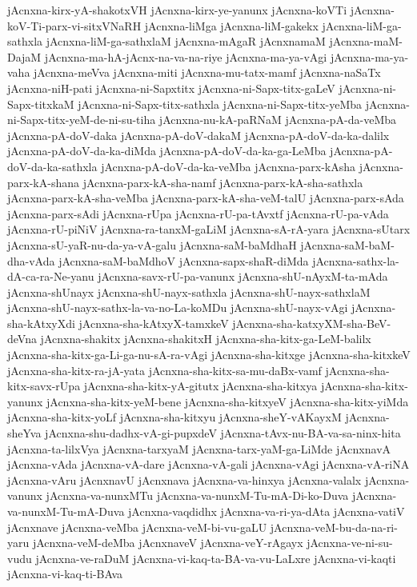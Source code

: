 {jAcnxna-kirx-yA-shakotxVH
jAcnxna-kirx-ye-yanunx
jAcnxna-koVTi
jAcnxna-koV-Ti-parx-vi-sitxVNaRH
jAcnxna-liMga
jAcnxna-liM-gakekx
jAcnxna-liM-ga-sathxla
jAcnxna-liM-ga-sathxlaM
jAcnxna-mAgaR
jAcnxnamaM
jAcnxna-maM-DajaM
jAcnxna-ma-hA-jAcnx-na-va-na-riye
jAcnxna-ma-ya-vAgi
jAcnxna-ma-ya-vaha
jAcnxna-meVva
jAcnxna-miti
jAcnxna-mu-tatx-mamf
jAcnxna-naSaTx
jAcnxna-niH-pati
jAcnxna-ni-Sapxtitx
jAcnxna-ni-Sapx-titx-gaLeV
jAcnxna-ni-Sapx-titxkaM
jAcnxna-ni-Sapx-titx-sathxla
jAcnxna-ni-Sapx-titx-yeMba
jAcnxna-ni-Sapx-titx-yeM-de-ni-su-tiha
jAcnxna-nu-kA-paRNaM
jAcnxna-pA-da-veMba
jAcnxna-pA-doV-daka
jAcnxna-pA-doV-dakaM
jAcnxna-pA-doV-da-ka-dalilx
jAcnxna-pA-doV-da-ka-diMda
jAcnxna-pA-doV-da-ka-ga-LeMba
jAcnxna-pA-doV-da-ka-sathxla
jAcnxna-pA-doV-da-ka-veMba
jAcnxna-parx-kAsha
jAcnxna-parx-kA-shana
jAcnxna-parx-kA-sha-namf
jAcnxna-parx-kA-sha-sathxla
jAcnxna-parx-kA-sha-veMba
jAcnxna-parx-kA-sha-veM-talU
jAcnxna-parx-sAda
jAcnxna-parx-sAdi
jAcnxna-rUpa
jAcnxna-rU-pa-tAvxtf
jAcnxna-rU-pa-vAda
jAcnxna-rU-piNiV
jAcnxna-ra-tanxM-gaLiM
jAcnxna-sA-rA-yara
jAcnxna-sUtarx
jAcnxna-sU-yaR-nu-da-ya-vA-galu
jAcnxna-saM-baMdhaH
jAcnxna-saM-baM-dha-vAda
jAcnxna-saM-baMdhoV
jAcnxna-sapx-shaR-diMda
jAcnxna-sathx-la-dA-ca-ra-Ne-yanu
jAcnxna-savx-rU-pa-vanunx
jAcnxna-shU-nAyxM-ta-mAda
jAcnxna-shUnayx
jAcnxna-shU-nayx-sathxla
jAcnxna-shU-nayx-sathxlaM
jAcnxna-shU-nayx-sathx-la-va-no-La-koMDu
jAcnxna-shU-nayx-vAgi
jAcnxna-sha-kAtxyXdi
jAcnxna-sha-kAtxyX-tamxkeV
jAcnxna-sha-katxyXM-sha-BeV-deVna
jAcnxna-shakitx
jAcnxna-shakitxH
jAcnxna-sha-kitx-ga-LeM-balilx
jAcnxna-sha-kitx-ga-Li-ga-nu-sA-ra-vAgi
jAcnxna-sha-kitxge
jAcnxna-sha-kitxkeV
jAcnxna-sha-kitx-ra-jA-yata
jAcnxna-sha-kitx-sa-mu-daBx-vamf
jAcnxna-sha-kitx-savx-rUpa
jAcnxna-sha-kitx-yA-gitutx
jAcnxna-sha-kitxya
jAcnxna-sha-kitx-yanunx
jAcnxna-sha-kitx-yeM-bene
jAcnxna-sha-kitxyeV
jAcnxna-sha-kitx-yiMda
jAcnxna-sha-kitx-yoLf
jAcnxna-sha-kitxyu
jAcnxna-sheY-vAKayxM
jAcnxna-sheYva
jAcnxna-shu-dadhx-vA-gi-pupxdeV
jAcnxna-tAvx-nu-BA-va-sa-ninx-hita
jAcnxna-ta-lilxVya
jAcnxna-tarxyaM
jAcnxna-tarx-yaM-ga-LiMde
jAcnxnavA
jAcnxna-vAda
jAcnxna-vA-dare
jAcnxna-vA-gali
jAcnxna-vAgi
jAcnxna-vA-riNA
jAcnxna-vAru
jAcnxnavU
jAcnxnava
jAcnxna-va-hinxya
jAcnxna-valalx
jAcnxna-vanunx
jAcnxna-va-nunxMTu
jAcnxna-va-nunxM-Tu-mA-Di-ko-Duva
jAcnxna-va-nunxM-Tu-mA-Duva
jAcnxna-vaqdidhx
jAcnxna-va-ri-ya-dAta
jAcnxna-vatiV
jAcnxnave
jAcnxna-veMba
jAcnxna-veM-bi-vu-gaLU
jAcnxna-veM-bu-da-na-ri-yaru
jAcnxna-veM-deMba
jAcnxnaveV
jAcnxna-veY-rAgayx
jAcnxna-ve-ni-su-vudu
jAcnxna-ve-raDuM
jAcnxna-vi-kaq-ta-BA-va-vu-LaLxre
jAcnxna-vi-kaqti
jAcnxna-vi-kaq-ti-BAva
}
